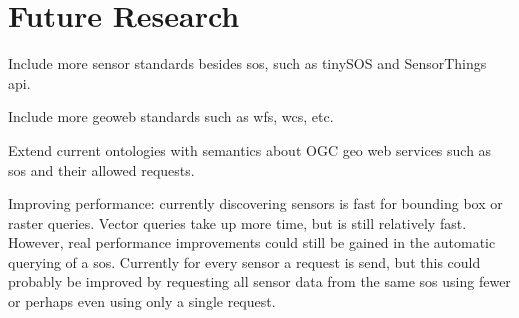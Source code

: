 
\chapter{Future Research}
\label{chap:futureResearch}

Include more sensor standards besides \ac{sos}, such as tinySOS and SensorThings \ac{api}.

Include more geoweb standards such as \ac{wfs}, \ac{wcs}, etc.

Extend current ontologies with semantics about OGC geo web services such as \ac{sos} and their allowed requests.

Improving performance: currently discovering sensors is fast for bounding box or raster queries. Vector queries take up more time, but is still relatively fast. However, real performance improvements could still be gained in the automatic querying of a \ac{sos}. Currently for every sensor a request is send, but this could probably be improved by requesting all sensor data from the same \ac{sos} using fewer or perhaps even using only a single request.  